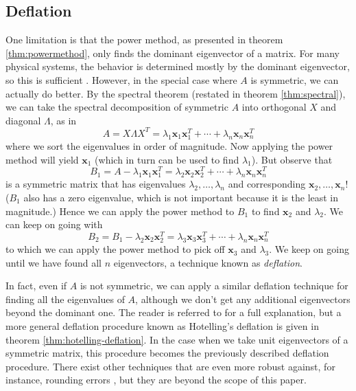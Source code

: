 \documentclass{article}
\let\vec\mathbf
\begin{document}
\subsection{Deflation}
One limitation is that the power method, as presented in theorem \ref{thm:powermethod}, only finds the dominant eigenvector of a matrix. For many physical systems, the behavior is determined mostly by the dominant eigenvector, so this is sufficient \cite{spanish}. However, in the special case where $A$ is symmetric, we can actually do better. By the spectral theorem (restated in theorem \ref{thm:spectral}), we can take the spectral decomposition of symmetric $A$ into orthogonal $X$ and diagonal $\Lambda$, as in
\begin{equation*}
  A = X \Lambda X^T = \lambda_1 \vec{x}_1 \vec{x}_1^T + \cdots + \lambda_n \vec{x}_n \vec{x}_n^T
\end{equation*}
where we sort the eigenvalues in order of magnitude. Now applying the power method will yield $\vec{x}_1$ (which in turn can be used to find $\lambda_1$). But observe that
\begin{equation*}
  B_1 = A - \lambda_1 \vec{x}_1 \vec{x}_1^T = \lambda_2 \vec{x}_2 \vec{x}_2^T + \cdots + \lambda_n \vec{x}_n \vec{x}_n^T
\end{equation*}
is a symmetric matrix that has eigenvalues $\lambda_2, \ldots, \lambda_n$ and corresponding $\vec{x}_2, \ldots, \vec{x}_n$! ($B_1$ also has a zero eigenvalue, which is not important because it is the least in magnitude.) Hence we can apply the power method to $B_1$ to find $\vec{x}_2$ and $\lambda_2$. We can keep on going with
\begin{equation*}
  B_2 = B_1 - \lambda_2 \vec{x}_2 \vec{x}_2^T = \lambda_3 \vec{x}_3 \vec{x}_3^T + \cdots + \lambda_n \vec{x}_n \vec{x}_n^T
\end{equation*}
to which we can apply the power method to pick off $\vec{x}_3$ and $\lambda_3$. We keep on going until we have found all $n$ eigenvectors, a technique known as \textit{deflation}.

In fact, even if $A$ is not symmetric, we can apply a similar deflation technique for finding all the eigenvalues of $A$, although we don't get any additional eigenvectors beyond the dominant one. The reader is referred to \cite{deflation} for a full explanation, but a more general deflation procedure known as Hotelling's deflation is given in theorem \ref{thm:hotelling-deflation}. In the case when we take unit eigenvectors of a symmetric matrix, this procedure becomes the previously described deflation procedure. There exist other techniques that are even more robust against, for instance, rounding errors \cite{deflation-robots}, but they are beyond the scope of this paper.
\end{document}
